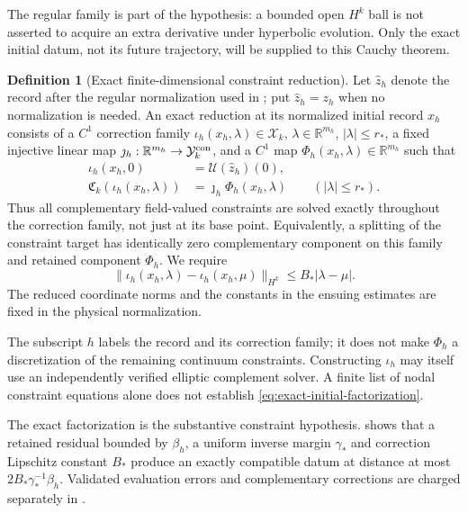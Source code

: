 \documentclass[11pt]{article}
\numberwithin{equation}{section}
\theoremstyle{definition}
\newtheorem{definition}[definition]{Definition}
\theoremstyle{remark}
\newcommand{\R}{\mathbb R}
\newcommand{\norm}[1]{\lVert#1\rVert}
\begin{document}
The regular family is part of the hypothesis: a bounded open $H^k$ ball is
not asserted to acquire an extra derivative under hyperbolic evolution.
Only the exact initial datum, not its future trajectory, will be supplied to
this Cauchy theorem.

\begin{definition}[Exact finite-dimensional constraint reduction]
\label{def:exact-initial-reduction}
Let $\widehat z_h$ denote the record after the regular normalization used in
; put $\widehat z_h=z_h$ when no
normalization is needed. An exact reduction at its normalized initial
record $x_h$ consists of a $C^1$ correction family
$\iota_h(x_h,\lambda)\in\mathcal X_k$, $\lambda\in\R^{m_h}$,
$|\lambda|\le r_*$, a fixed injective linear map
$\jmath_h:\R^{m_h}\to\mathcal Y_k^{\rm con}$, and a $C^1$ map
$\Phi_h(x_h,\lambda)\in\R^{m_h}$ such that
\begin{align}
 \iota_h(x_h,0)&=\mathcal U(\widehat z_h)(0),
       \label{eq:exact-initial-basepoint}\\
 \mathfrak C_k(\iota_h(x_h,\lambda))
       &=\jmath_h\Phi_h(x_h,\lambda)
       \qquad(|\lambda|\le r_*).
       \label{eq:exact-initial-factorization}
\end{align}
Thus all complementary field-valued constraints are solved exactly
throughout the correction family, not just at its base point. Equivalently,
a splitting of the constraint target has identically zero complementary
component on this family and retained component $\Phi_h$. We require
\begin{equation}
 \norm{\iota_h(x_h,\lambda)-\iota_h(x_h,\mu)}_{H^k}
       \le B_*|\lambda-\mu|.
 \label{eq:exact-initial-reader-Lipschitz}
\end{equation}
The reduced coordinate norms and the constants in the ensuing estimates
are fixed in the physical normalization.
\end{definition}

The subscript $h$ labels the record and its correction family; it does not
make $\Phi_h$ a discretization of the remaining continuum constraints.
Constructing $\iota_h$ may itself use an independently verified elliptic
complement solver. A finite list of nodal constraint equations alone does
not establish \eqref{eq:exact-initial-factorization}.

The exact factorization is the substantive constraint hypothesis.
 shows that a retained residual
bounded by $\beta_h$, a uniform inverse margin $\gamma_*$ and correction
Lipschitz constant $B_*$ produce an exactly compatible datum at distance
at most $2B_*\gamma_*^{-1}\beta_h$. Validated evaluation errors and
complementary corrections are charged separately in
.
\end{document}
